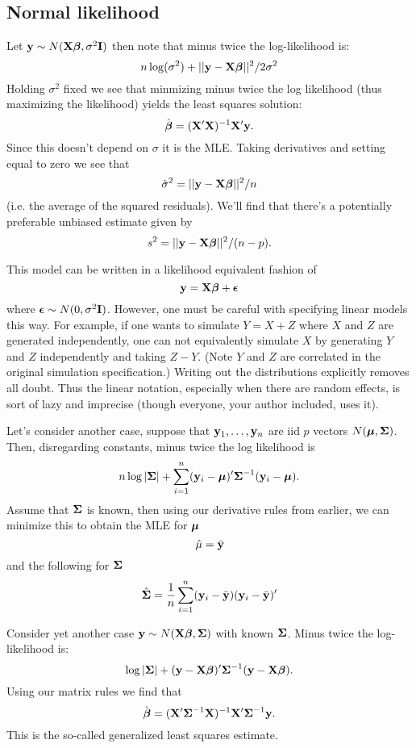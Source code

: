 \subsection{Normal likelihood}


Let $\mathbf{y} \sim N(\mathbf{X} \boldsymbol{\beta}, \sigma^2 \mathbf{I})$ then note that 
minus twice the log-likelihood is:
$$
n\log(\sigma^2) + ||\mathbf{y} - \mathbf{X} \boldsymbol{\beta}||^2 / 2\sigma^2
$$
Holding $\sigma^2$ fixed we see that minmizing minus twice
the log likelihood (thus maximizing the likelihood) yields
the least squares solution:
$$
\hat {\boldsymbol{\beta}} = (\mathbf{X'} \mathbf{X})^{-1} \mathbf{X}' \mathbf{y}.
$$
Since this doesn't depend on $\sigma$ it is the MLE. 
Taking derivatives and setting equal to zero we
see that 
$$
\hat \sigma^2 = ||\mathbf{y} - \mathbf{X} \boldsymbol{\beta}||^2 / n
$$
(i.e. the average of the squared residuals). We'll
find that there's a potentially preferable unbiased
estimate given by
$$
s^2 = ||\mathbf{y} - \mathbf{X} \boldsymbol{\beta}||^2 / (n - p).
$$

This model can be written in a  likelihood equivalent fashion
of  
$$
\mathbf{y} = \mathbf{X} \boldsymbol{\beta} + \boldsymbol{\epsilon}
$$
where $\boldsymbol{\epsilon} \sim N(0, \sigma^2 \mathbf{I})$. However, one
must be careful with specifying linear models this way.
For example, if one wants to simulate $Y = X + Z$ where $X$ and $Z$ are generated
independently, one can not equivalently simulate $X$
by generating $Y$ and $Z$ independently and taking $Z - Y$.
(Note $Y$ and $Z$ are correlated in the original simulation specification.)
Writing out the distributions explicitly removes all doubt. 
Thus the linear notation, especially when there are random effects, is sort
of lazy and imprecise (though everyone, your author included, uses it). 


Let's consider another case, suppose that $\mathbf{y}_1, \ldots, \mathbf{y}_n$ are iid $p$ vectors
$N(\boldsymbol{\mu}, \boldsymbol{\Sigma})$. Then, disregarding constants, minus twice the log likelihood is
$$
n \log|\boldsymbol{\Sigma}| + \sum_{i=1}^n (\mathbf{y}_i - \boldsymbol{\mu})' \boldsymbol{\Sigma}^{-1} (\mathbf{y}_i - \boldsymbol{\mu}).
$$
Assume that $\boldsymbol{\Sigma}$ is known, then using our derivative rules from earlier,
we can minimize this to obtain the MLE for $\boldsymbol{\mu}$
$$
\hat \mu = \bar {\mathbf{y}} 
$$
and the following for $\boldsymbol{\Sigma}$
$$
\hat {\boldsymbol{\Sigma}} = \frac{1}{n} \sum_{i=1}^n (\mathbf{y}_i - \bar {\mathbf{y}}) (\mathbf{y}_i -\bar {\mathbf{y}})'
$$


Consider yet another case $\mathbf{y} \sim N(\mathbf{X}\boldsymbol{\beta}, \boldsymbol{\Sigma})$ with known $\boldsymbol{\Sigma}$.
Minus twice the log-likelihood is:
$$
\log |\boldsymbol{\Sigma}| + (\mathbf{y} - \mathbf{X} \boldsymbol{\beta})' \boldsymbol{\Sigma}^{-1} (\mathbf{y} - \mathbf{X} \boldsymbol{\beta}).
$$
Using our matrix rules we find that
$$
\hat {\boldsymbol{\beta}} = (\mathbf{X}' \boldsymbol{\Sigma}^{-1} \mathbf{X})^{-1} \mathbf{X}' \boldsymbol{\Sigma}^{-1}\mathbf{y}. 
$$
This is the so-called generalized least squares estimate. 





